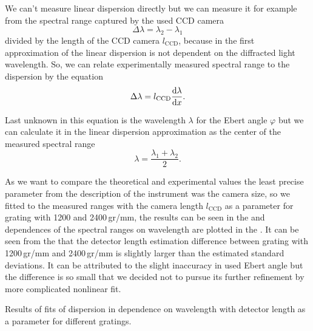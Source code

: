 We can't measure linear dispersion directly but we can measure it for example
from the spectral range captured by the used CCD camera
\begin{equation*}
	\Delta\lambda = \lambda_2 - \lambda_1
\end{equation*}
divided by the length of the CCD camera $l_\text{CCD}$, because in the first
approximation of
the linear dispersion is not dependent on the diffracted light wavelength. So,
we can relate experimentally measured spectral range to the dispersion by the
equation
\begin{equation}
	\Delta\lambda = l_\text{CCD}\frac{\text{d}\lambda}{\text{d}x}.
	\label{\eqnlabel{spectrograph_selection:measured_range}}
\end{equation}

Last unknown in this equation is the wavelength $\lambda$ for the Ebert angle
$\varphi$ but we can calculate it in the linear dispersion approximation as the
center of the measured spectral range
\begin{equation*}
	\lambda = \frac{\lambda_1 + \lambda_2}{2}.
\end{equation*}

As we want to compare the theoretical and experimental values the least precise
parameter from the description of the instrument was the camera size, so we
fitted
to the measured ranges with the camera length $l_\text{CCD}$ as a parameter for
grating with 1200 and 2400\,gr/mm, the results can be seen in the
and dependences of the spectral ranges on wavelength are plotted in the
.
It can be seen from the
that the detector length estimation difference between grating
with 1200\,gr/mm and 2400\,gr/mm is slightly larger than the estimated
standard deviations. It can be attributed to the slight inaccuracy in used
Ebert angle but the difference is so small that we decided not to pursue its
further refinement by more complicated nonlinear fit.

\begin{table}
	\centering
	
	\caption{Results of fits of dispersion in dependence on wavelength with
		detector length as a parameter for different gratings.}
	\label{\tablabel{spectrograph_selection:detector_length_fits}}
\end{table}

